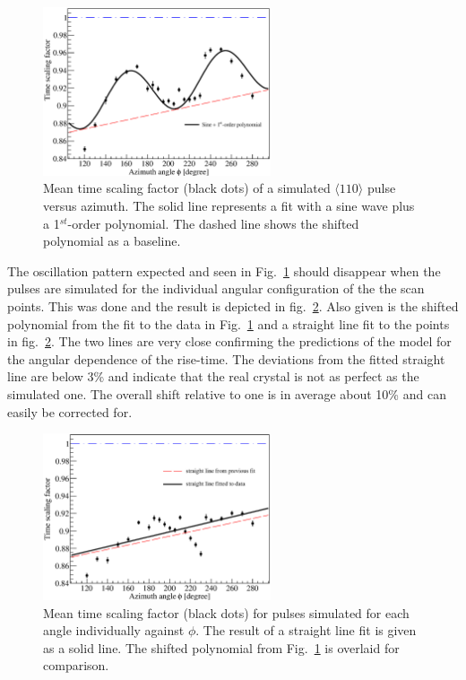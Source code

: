 \begin{figure}[htbp]
\centering
\includegraphics[width=0.6\textwidth]{tsc}
\caption{Mean time scaling factor (black dots) of a simulated $\langle
110 \rangle$ pulse versus azimuth. The solid line represents a fit
with a sine wave plus a 1$^{st}$-order polynomial. The dashed line
shows the shifted polynomial as a baseline.}
\label{fig:psa:tsc}
\end{figure}

The oscillation pattern expected and seen in Fig.~\ref{fig:psa:tsc}
should disappear when the pulses are simulated for the individual
angular configuration of the the scan points. This was done and the
result is depicted in fig.~\ref{fig:psa:tsl}. Also given is the
shifted polynomial from the fit to the data in Fig.~\ref{fig:psa:tsc}
and a straight line fit to the points in fig.~\ref{fig:psa:tsl}. The
two lines are very close confirming the predictions of the model for
the angular dependence of the rise-time. The deviations from the
fitted straight line are below 3\% and indicate that the real crystal
is not as perfect as the simulated one. The overall shift relative to
one is in average about 10\% and can easily be corrected for.

\begin{figure}[htbp]
\centering
\includegraphics[width=0.6\textwidth]{tsline}
\caption{Mean time scaling factor (black dots) for pulses simulated
for each angle individually against $\phi$. The result of a straight
line fit is given as a solid line. The shifted polynomial from
Fig.~\ref{fig:psa:tsc} is overlaid for comparison.}
\label{fig:psa:tsl}
\end{figure}


